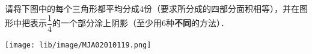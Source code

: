 请将下图中的每个三角形都平均分成4份（要求所分成的四部分面积相等），并在图形中把表示$\dfrac {1}{4}$的一个部分涂上阴影（至少用6种\textbf{不同}的方法）．\\
\begin{center}
\texttt{[image: lib/image/MJA02010119.png]}
\end{center}
